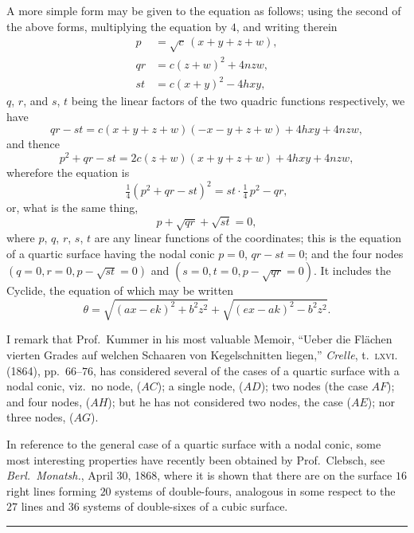 \documentclass[11pt,a4paper]{article}
\begin{document}
\medskip

A more simple form may be given to the equation as follows; using the
second of the above forms, multiplying the equation by $4$, and writing
therein
\[
\begin{aligned}
p &= \sqrt{c}\,(x + y + z + w),\\
q r &= c (z + w)^{2} + 4 n z w,\\
s t &= c (x + y)^{2} - 4 h x y,
\end{aligned}
\]
$q$, $r$, and $s$, $t$ being the linear factors of the two quadric
functions respectively, we have
\[
q r - s t = c (x + y + z + w)(-x - y + z + w) + 4 h x y + 4 n z w,
\]
and thence
\[
p^{2} + q r - s t = 2 c (z + w)(x + y + z + w) + 4 h x y + 4 n z w,
\]
wherefore the equation is
\[
\tfrac{1}{4}(p^{2} + q r - s t)^{2} = s t \cdot \tfrac{1}{4}\,p^{2} - q r, \tag{$AH$}
\]
or, what is the same thing,
\[
p + \sqrt{q r} + \sqrt{s t} = 0, \tag{$AH$}
\]
where $p$, $q$, $r$, $s$, $t$ are any linear functions of the coordinates;
this is the equation of a quartic surface having the nodal conic $p = 0$,
$q r - s t = 0$; and the four nodes $(q = 0, r = 0, p - \sqrt{s t} = 0)$
and $(s = 0, t = 0, p - \sqrt{q r} = 0)$. It includes the Cyclide, the
equation of which may be written
\[
\theta = \sqrt{(a x - e k)^{2} + b^{2} z^{2}}
+ \sqrt{(e x - a k)^{2} - b^{2} z^{2}}.
\]

I remark that Prof.\ Kummer in his most valuable Memoir, ``Ueber die
Fl\"achen vierten Grades auf welchen Schaaren von Kegelschnitten liegen,''
\textit{Crelle}, t.~\textsc{lxvi.} (1864), pp.~$66$--$76$, has considered
several of the cases of a quartic surface with a nodal conic, viz.\ no
node, ($AC$); a single node, ($AD$); two nodes (the case $AF$); and four
nodes, ($AH$); but he has not considered two nodes, the case ($AE$); nor
three nodes, ($AG$).

In reference to the general case of a quartic surface with a nodal conic,
some most interesting properties have recently been obtained by Prof.\
Clebsch, see \textit{Berl.\ Monatsh.}, April 30, 1868, where it is shown
that there are on the surface $16$ right lines forming $20$ systems of
double-fours, analogous in some respect to the $27$ lines and $36$ systems
of double-sixes of a cubic surface.

\bigskip
\hrule
\bigskip

\end{document}
